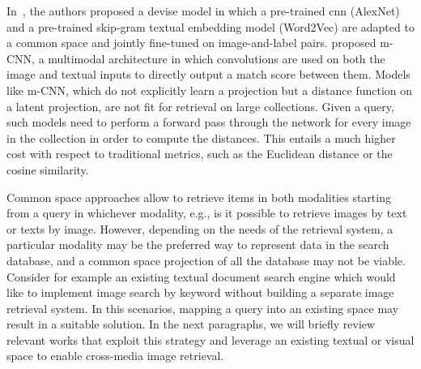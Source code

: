 In~\cite{frome2013devise}, the authors proposed a \gls{devise} model in which a pre-trained \gls{cnn} (AlexNet) and a pre-trained skip-gram textual embedding model (Word2Vec) are adapted to a common space and jointly fine-tuned on image-and-label pairs.
\citet{ma2015multimodal} proposed m-CNN, a multimodal architecture in which convolutions are used on both the image and textual inputs to directly output a match score between them.
Models like m-CNN, which do not explicitly learn a projection but a distance function on a latent projection, are not fit for retrieval on large collections.
Given a query, such models need to perform a forward pass through the network for every image in the collection in order to compute the distances.
This entails a much higher cost with respect to traditional metrics, such as the Euclidean distance or the cosine similarity.

Common space approaches allow to retrieve items in both modalities starting from a query in whichever modality, e.g., is it possible to retrieve images by text or texts by image.
However, depending on the needs of the retrieval system, a particular modality may be the preferred way to represent data in the search database, and a common space projection of all the database may not be viable.
Consider for example an existing textual document search engine which would like to implement image search by keyword without building a separate image retrieval system.
In this scenarios, mapping a query into an existing space may result in a suitable solution.
In the next paragraphs, we will briefly review relevant works that exploit this strategy and leverage an existing textual or visual space to enable cross-media image retrieval.

